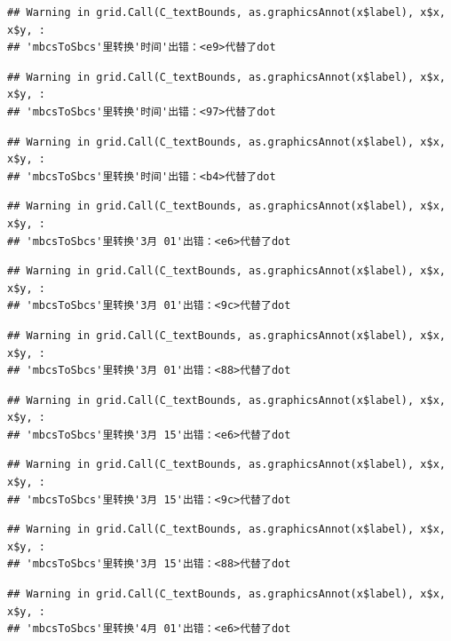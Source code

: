 \documentclass[
]{article}
\begin{document}
\begin{verbatim}
## Warning in grid.Call(C_textBounds, as.graphicsAnnot(x$label), x$x, x$y, :
## 'mbcsToSbcs'里转换'时间'出错：<e9>代替了dot
\end{verbatim}

\begin{verbatim}
## Warning in grid.Call(C_textBounds, as.graphicsAnnot(x$label), x$x, x$y, :
## 'mbcsToSbcs'里转换'时间'出错：<97>代替了dot
\end{verbatim}

\begin{verbatim}
## Warning in grid.Call(C_textBounds, as.graphicsAnnot(x$label), x$x, x$y, :
## 'mbcsToSbcs'里转换'时间'出错：<b4>代替了dot
\end{verbatim}

\begin{verbatim}
## Warning in grid.Call(C_textBounds, as.graphicsAnnot(x$label), x$x, x$y, :
## 'mbcsToSbcs'里转换'3月 01'出错：<e6>代替了dot
\end{verbatim}

\begin{verbatim}
## Warning in grid.Call(C_textBounds, as.graphicsAnnot(x$label), x$x, x$y, :
## 'mbcsToSbcs'里转换'3月 01'出错：<9c>代替了dot
\end{verbatim}

\begin{verbatim}
## Warning in grid.Call(C_textBounds, as.graphicsAnnot(x$label), x$x, x$y, :
## 'mbcsToSbcs'里转换'3月 01'出错：<88>代替了dot
\end{verbatim}

\begin{verbatim}
## Warning in grid.Call(C_textBounds, as.graphicsAnnot(x$label), x$x, x$y, :
## 'mbcsToSbcs'里转换'3月 15'出错：<e6>代替了dot
\end{verbatim}

\begin{verbatim}
## Warning in grid.Call(C_textBounds, as.graphicsAnnot(x$label), x$x, x$y, :
## 'mbcsToSbcs'里转换'3月 15'出错：<9c>代替了dot
\end{verbatim}

\begin{verbatim}
## Warning in grid.Call(C_textBounds, as.graphicsAnnot(x$label), x$x, x$y, :
## 'mbcsToSbcs'里转换'3月 15'出错：<88>代替了dot
\end{verbatim}

\begin{verbatim}
## Warning in grid.Call(C_textBounds, as.graphicsAnnot(x$label), x$x, x$y, :
## 'mbcsToSbcs'里转换'4月 01'出错：<e6>代替了dot
\end{verbatim}
\end{document}
